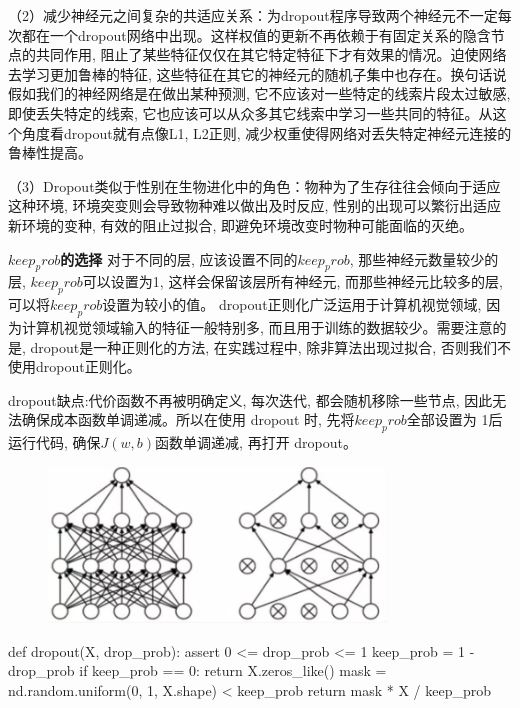 \documentclass[a4paper]{article}
\begin{document}
（2）减少神经元之间复杂的共适应关系：为dropout程序导致两个神经元不一定每次都在一个dropout网络中出现。这样权值的更新不再依赖于有固定关系的隐含节点的共同作用, 阻止了某些特征仅仅在其它特定特征下才有效果的情况。迫使网络去学习更加鲁棒的特征, 这些特征在其它的神经元的随机子集中也存在。换句话说假如我们的神经网络是在做出某种预测, 它不应该对一些特定的线索片段太过敏感, 即使丢失特定的线索, 它也应该可以从众多其它线索中学习一些共同的特征。从这个角度看dropout就有点像L1, L2正则, 减少权重使得网络对丢失特定神经元连接的鲁棒性提高。

（3）Dropout类似于性别在生物进化中的角色：物种为了生存往往会倾向于适应这种环境, 环境突变则会导致物种难以做出及时反应, 性别的出现可以繁衍出适应新环境的变种, 有效的阻止过拟合, 即避免环境改变时物种可能面临的灭绝。 

\textbf{$keep_prob$的选择}
对于不同的层, 应该设置不同的$keep_prob$, 那些神经元数量较少的层, $keep_prob$可以设置为1, 这样会保留该层所有神经元, 而那些神经元比较多的层, 可以将$keep_prob$设置为较小的值。
dropout正则化广泛运用于计算机视觉领域, 因为计算机视觉领域输入的特征一般特别多, 而且用于训练的数据较少。需要注意的是, dropout是一种正则化的方法, 在实践过程中, 除非算法出现过拟合, 否则我们不使用dropout正则化。

dropout缺点:代价函数不再被明确定义, 每次迭代, 都会随机移除一些节点, 因此无法确保成本函数单调递减。所以在使用 dropout 时, 先将$keep_prob$全部设置为 1后运行代码, 确保$J(w, b)$函数单调递减, 再打开 dropout。


\begin{figure}[!ht]
\center
\includegraphics[width=0.8\textwidth]{dropout.png}
\end{figure}

\begin{python}
def dropout(X,  drop_prob):
    assert 0 <= drop_prob <= 1
    keep_prob = 1 - drop_prob
    if keep_prob == 0:
        return X.zeros_like()
    mask = nd.random.uniform(0,  1,  X.shape) < keep_prob
    return mask * X / keep_prob
\end{python}
\end{document}
